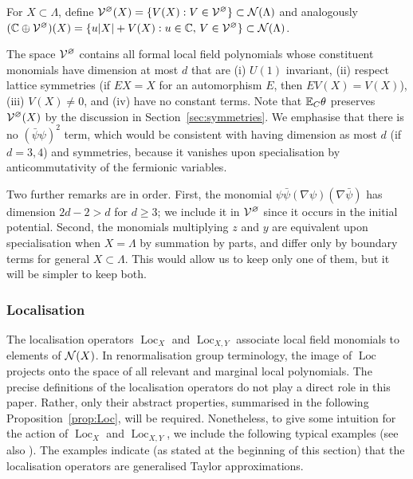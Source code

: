 \documentclass[11pt]{amsart}
\numberwithin{equation}{section}
\numberwithin{theorem}{section}
\newcommand{\1}{{\bf 1}}
\newcommand{\cVbulk}{\cV^\varnothing}
\newcommand{\Loc}{\operatorname{Loc}}
\begin{document}
\begin{definition}
  For $X\subset \Lambda$,
  define $\cVbulk(X) = \{V(X): V\in \cVbulk\} \subset \cN(\Lambda)$ 
  and analogously $(\C \oplus \cVbulk)(X) = \{ u|X|+V(X): u\in \C, \,
  V \in \cVbulk\} \subset \cN(\Lambda)$.
\end{definition}

The space $\cVbulk$ contains all formal local field polynomials
whose constituent monomials have dimension at most $d$ that are (i)
$U(1)$ invariant, (ii) respect lattice symmetries (if $EX=X$
for an automorphism $E$, then $EV(X)=V(X)$), (iii)
$V(X)\neq 0$, and (iv) have no constant terms.  Note that
  $\mathbb{E}_C\theta$ preserves $\cVbulk(X)$ by the discussion in
  Section~\ref{sec:symmetries}.  We emphasise that there is
no $(\bar\psi\psi)^2$ term, which would be consistent with
  having dimension as most $d$ (if $d=3,4$) and symmetries, because
it vanishes upon specialisation by anticommutativity of the fermionic
variables.



Two further remarks are in order.
First, the monomial $\psi\bar\psi (\nabla\psi)(\nabla\bar\psi)$ has dimension
$2d-2>d$ for $d\geq 3$; we include it in $\cVbulk$ 
since it occurs in the initial potential. Second,
the monomials multiplying $z$ and $y$ are equivalent upon
specialisation when $X=\Lambda$
by summation by parts, and differ
only by boundary terms for general $X \subset \Lambda$.
This would
allow us to keep only one of them, but it will be simpler to keep both.



\subsubsection*{Localisation}
The localisation operators $\Loc_X$ and $\Loc_{X,Y}$ associate local field
monomials to elements of $\mathcal N(X)$.  In renormalisation group
terminology, the image of $\Loc$ projects onto the space of all
relevant and marginal local polynomials.
%
The precise definitions of the localisation operators do not play a
direct role in this paper.  Rather, only their abstract properties,
summarised in the following Proposition~\ref{prop:Loc}, will be required.
%
Nonetheless, to give some intuition for the action of $\Loc_X$ and
$\Loc_{X,Y}$, we include the following typical examples (see also
\cite[Section~1.5]{MR3332939}).  The examples indicate (as
stated at the beginning of this section) that the localisation
operators are generalised Taylor approximations.
\end{document}
